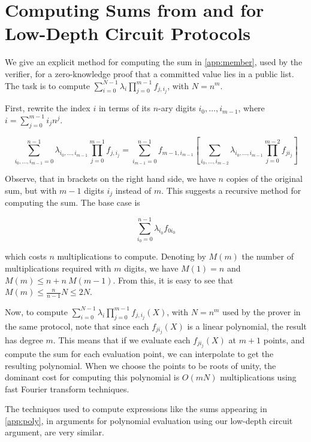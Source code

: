\chapter{Computing Sums from \cite{GrothK15} and \cite{BayerG13} for Low-Depth Circuit Protocols}
\label{appendixlabel2}

We give an explicit method for computing the sum in \ref{app:member}, used by the verifier, for a zero-knowledge proof that a committed value lies in a public list. The task is to compute $ \sum_{i=0}^{N-1} \lambda_i \prod_{j=0}^{m-1} f_{j,i_j} $, with $N = n^m$.

First, rewrite the index $i$ in terms of its $n$-ary digits $i_0,\ldots,i_{m-1}$, where $i = \sum_{j=0}^{m-1} i_j n^j$.

$$\sum_{i_0,\ldots,i_{m-1} = 0}^{n-1} \lambda_{i_0,\ldots,i_{m-1}} \prod_{j=0}^{m-1} f_{j,i_j} = \sum_{i_{m-1}=0}^{n-1} f_{m-1, i_{m-1}} \left[ \sum_{i_0,\ldots,i_{m-2}} \lambda_{i_0,\ldots,i_{m-1}} \prod_{j=0}^{m-2} f_{j i_j} \right]$$

Observe, that in brackets on the right hand side, we have $n$ copies of the original sum, but with $m-1$ digits $i_j$ instead of $m$. This suggests a recursive method for computing the sum. The base case is

$$ \sum_{i_0 = 0}^{n-1} \lambda_{i_0} f_{0 i_0} $$

which costs $n$ multiplications to compute. Denoting by $M(m)$ the number of multiplications required with $m$ digits, we have $M(1) = n$ and $M(m) \leq n + n \ M(m-1)$. From this, it is easy to see that $M(m) \leq \frac{n}{n-1} N \leq 2N$.

Now, to compute $ \sum_{i=0}^{N-1} \lambda_i \prod_{j=0}^{m-1} f_{j,i_j}(X) $, with $N = n^m$ used by the prover in the same protocol, note that since each $f_{j i_j}(X)$ is a linear polynomial, the result has degree $m$. This means that if we evaluate each $f_{j i_j}(X)$ at $m+1$ points, and compute the sum for each evaluation point, we can interpolate to get the resulting polynomial. When we choose the points to be roots of unity, the dominant cost for computing this polynomial is $O(mN)$ multiplications using fast Fourier transform techniques.

The techniques used to compute expressions like the sums appearing in \ref{app:poly}, in arguments for polynomial evaluation using our low-depth circuit argument, are very similar.
%
%

